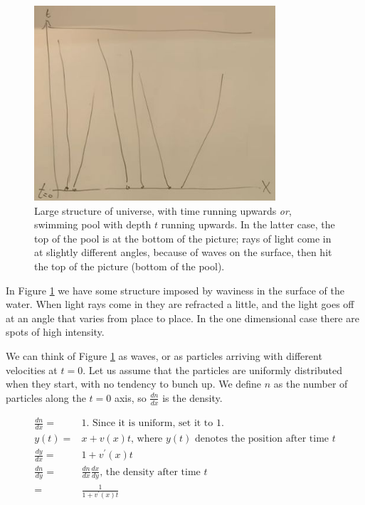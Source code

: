 \documentclass[]{article}
\begin{document}
\begin{figure}[h]
	\caption[Explanation of Large Structure]{Large structure of universe, with time running upwards \emph{or}, swimming pool with depth $t$ running upwards. In the latter case, the top of the pool is at the bottom of the picture; rays of light come in at slightly different angles, because of waves on the surface, then hit the top of the picture (bottom of the pool). }\label{fig:cosmo-9-caustic}
	\begin{center}
		\includegraphics[width=0.8\textwidth]{cosmo-9-caustic}
	\end{center}
\end{figure}

In Figure \ref{fig:cosmo-9-caustic} we have some structure imposed by waviness in the surface of the water. When light rays come in they are refracted a little, and the light goes off at an angle that varies from place to place. In the one dimensional case there are spots of high intensity.

We can think of  Figure \ref{fig:cosmo-9-caustic} as waves, or as particles arriving with different velocities at $t=0$. Let us assume that the particles are uniformly distributed when they start, with no tendency to bunch up. We define $n$ as the number of particles along the $t=0$ axis, so $\frac{dn}{dx}$ is the density. 

\begin{align*}
	\frac{dn}{dx}=&1 \text{. Since it is uniform, set it to $1$.}\\
	y(t) =& x +v(x)t \text{, where $y(t)$ denotes the position after time $t$}\\
	\frac{dy}{dx} =& 1+v^{\prime}(x)t\\
	\frac{dn}{dy} =& \frac{dn}{dx} \frac{dx}{dy} \text{, the density after time $t$}\\
	=& \frac{1}{1+v^{\prime}(x)t} 
\end{align*}    
\end{document}
